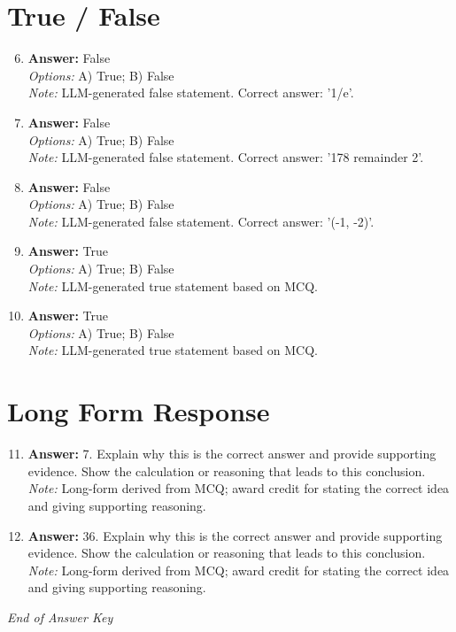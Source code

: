 \documentclass[12pt]{article}
\begin{document}
\section*{True / False}
\begin{enumerate}[label=\arabic*.]
\setcounter{enumi}{5}
\item \textbf{Answer:} False
\\ \textit{Options:} A) True; B) False
\\ \textit{Note:} LLM-generated false statement. Correct answer: '1/e'.
\item \textbf{Answer:} False
\\ \textit{Options:} A) True; B) False
\\ \textit{Note:} LLM-generated false statement. Correct answer: '178 remainder 2'.
\item \textbf{Answer:} False
\\ \textit{Options:} A) True; B) False
\\ \textit{Note:} LLM-generated false statement. Correct answer: '(-1, -2)'.
\item \textbf{Answer:} True
\\ \textit{Options:} A) True; B) False
\\ \textit{Note:} LLM-generated true statement based on MCQ.
\item \textbf{Answer:} True
\\ \textit{Options:} A) True; B) False
\\ \textit{Note:} LLM-generated true statement based on MCQ.
\end{enumerate}

\section*{Long Form Response}
\begin{enumerate}[label=\arabic*.]
\setcounter{enumi}{10}
\item \textbf{Answer:} 7. Explain why this is the correct answer and provide supporting evidence. Show the calculation or reasoning that leads to this conclusion.
\\ \textit{Note:} Long-form derived from MCQ; award credit for stating the correct idea and giving supporting reasoning.
\item \textbf{Answer:} 36. Explain why this is the correct answer and provide supporting evidence. Show the calculation or reasoning that leads to this conclusion.
\\ \textit{Note:} Long-form derived from MCQ; award credit for stating the correct idea and giving supporting reasoning.
\end{enumerate}

\vfill
\noindent\textit{End of Answer Key}
\end{document}
